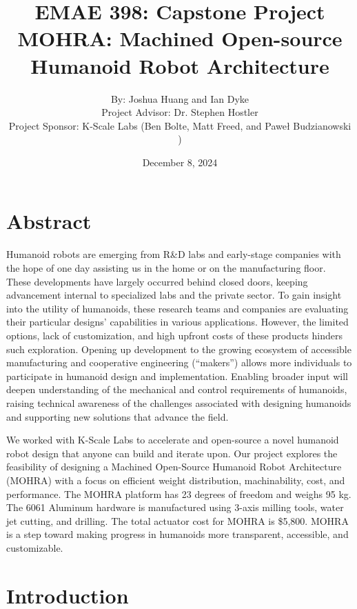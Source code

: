 \documentclass{article}
\title{EMAE 398: Capstone Project \\ 
MOHRA: Machined Open-source Humanoid Robot Architecture}
\author{ By: Joshua Huang and Ian Dyke \\ Project Advisor: Dr. Stephen Hostler \\ Project Sponsor: K-Scale Labs (Ben Bolte, Matt Freed, and Paweł Budzianowski )}
\date{December 8, 2024}
\begin{document}
\maketitle

\newpage
\tableofcontents
\newpage



\section{Abstract}

Humanoid robots are emerging from R\&D labs and early-stage companies with the hope of one day assisting us in the home or on the manufacturing floor. These developments have largely occurred behind closed doors, keeping advancement internal to specialized labs and the private sector. To gain insight into the utility of humanoids, these research teams and companies are evaluating their particular designs’ capabilities in various applications. However, the limited options, lack of customization, and high upfront costs of these products hinders such exploration. Opening up development to the growing ecosystem of accessible manufacturing and cooperative engineering (“makers”) allows more individuals to participate in humanoid design and implementation. Enabling broader input will deepen understanding of the mechanical and control requirements of humanoids, raising technical awareness of the challenges associated with designing humanoids and supporting new solutions that advance the field.

We worked with K-Scale Labs to accelerate and open-source a novel humanoid robot design that anyone can build and iterate upon. Our project explores the feasibility of designing a Machined Open-Source Humanoid Robot Architecture (MOHRA) with a focus on efficient weight distribution, machinability, cost, and performance. The MOHRA platform has 23 degrees of freedom and weighs 95 kg. The 6061 Aluminum hardware is manufactured using 3-axis milling tools, water jet cutting, and drilling. The total actuator cost for MOHRA is \$5,800.  MOHRA is a step toward making progress in humanoids more transparent, accessible, and customizable. 


\section{Introduction}
\end{document}
